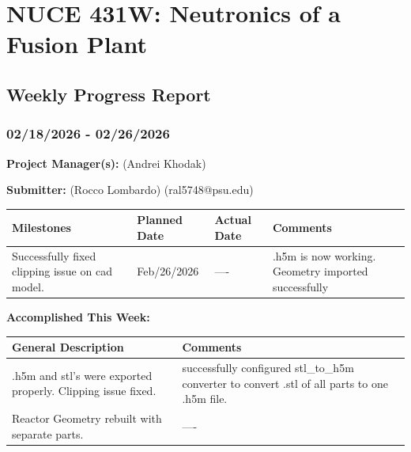 \documentclass{article}
\begin{document}
{\centering \section*{NUCE 431W: Neutronics of a Fusion Plant}

\subsection*{Weekly Progress Report}

\subsubsection*{02/18/2026 - 02/26/2026}}


\hrulefill

\bigskip

\textbf{Project Manager(s):} (Andrei Khodak) 

\bigskip

\textbf{Submitter:} (Rocco Lombardo) (ral5748@psu.edu)

\bigskip

\renewcommand{\arraystretch}{1.5}
\begin{table}[H]
    \centering
    \begin{tabularx}{0.95\textwidth} { 
        | >{\centering\arraybackslash}X 
        | >{\centering\arraybackslash}X 
        | >{\centering\arraybackslash}X
        | >{\centering\arraybackslash}X | }

    \hline
    \textbf{Milestones} & \textbf{Planned Date} & \textbf{Actual Date} & \textbf{Comments} \\
    \hline
    Successfully fixed clipping issue on cad model.   & Feb/26/2026  & ---- & .h5m is now working. Geometry imported successfully  \\
    \hline
    \end{tabularx}
\end{table}

\bigskip

\textbf{Accomplished This Week: }

\renewcommand{\arraystretch}{1.5}
\begin{table}[H]
    \centering
    \begin{tabularx}{0.95\textwidth} { 
        | >{\centering\arraybackslash}X
        | >{\centering\arraybackslash}X | }

    \hline
    \textbf{General Description} & \textbf{Comments} \\
    \hline
    .h5m and stl's were exported properly. Clipping issue fixed.  & successfully configured stl\_to\_h5m converter to convert .stl of all parts to one .h5m file. \\
    \hline
    Reactor Geometry rebuilt with separate parts. & ---- \\
    \hline
    \end{tabularx}
\end{table}
\end{document}
